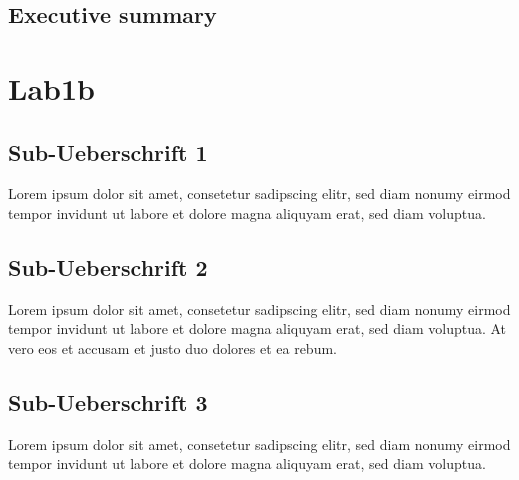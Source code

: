 \documentclass[12pt,a4paper,titlepage,oneside]{scrartcl}
\begin{document}
\subsection{Executive summary}
\section{Lab1b}

\subsection{Sub-Ueberschrift 1}
Lorem ipsum dolor sit amet, consetetur sadipscing elitr, sed diam nonumy eirmod tempor invidunt ut labore et dolore magna aliquyam erat, sed diam voluptua. 

\subsection{Sub-Ueberschrift 2}
Lorem ipsum dolor sit amet, consetetur sadipscing elitr, sed diam nonumy eirmod tempor invidunt ut labore et dolore magna aliquyam erat, sed diam voluptua. At vero eos et accusam et justo duo dolores et ea rebum. 

\subsection{Sub-Ueberschrift 3}
Lorem ipsum dolor sit amet, consetetur sadipscing elitr, sed diam nonumy eirmod tempor invidunt ut labore et dolore magna aliquyam erat, sed diam voluptua. 
\end{document}
